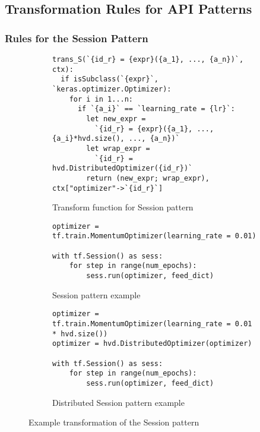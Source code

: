 \subsection{Transformation Rules for API Patterns}


\subsubsection{Rules for the Session Pattern}

\begin{figure}[h!]\centering

  \begin{subfigure}{1\textwidth}
  \scriptsize
  \begin{lstlisting}[style=mpython]
trans_S(`{id_r} = {expr}({a_1}, ..., {a_n})`, ctx): 
  if isSubclass(`{expr}`, `keras.optimizer.Optimizer):
    for i in 1...n:
      if `{a_i}` == `learning_rate = {lr}`:
	    let new_expr = 
          `{id_r} = {expr}({a_1}, ..., {a_i}*hvd.size(), ..., {a_n})`
        let wrap_expr = 
          `{id_r} = hvd.DistributedOptimizer({id_r})`
        return (new_expr; wrap_expr), ctx["optimizer"->`{id_r}`] 
  \end{lstlisting}
  \caption{Transform function for Session pattern}
  \label{fig:trans:sessiontrans:fn}
  \end{subfigure}

  \begin{subfigure}[t]{1\textwidth}
    \begin{lstlisting}[style=mpython]
optimizer = tf.train.MomentumOptimizer(learning_rate = 0.01)

with tf.Session() as sess:
    for step in range(num_epochs): 
        sess.run(optimizer, feed_dict)\end{lstlisting}
    \caption{Session pattern example}
    \label{fig:trans:sessiontrans:a}
  \end{subfigure}
  \hspace{5mm}
  \begin{subfigure}[t]{1\textwidth}
    \begin{lstlisting}[style=mpython]
optimizer = tf.train.MomentumOptimizer(learning_rate = 0.01 * hvd.size())
optimizer = hvd.DistributedOptimizer(optimizer)

with tf.Session() as sess:
    for step in range(num_epochs): 
        sess.run(optimizer, feed_dict)\end{lstlisting}
    \caption{Distributed Session pattern example}
    \label{fig:trans:sessiontrans:b}
  \end{subfigure}
  \caption{Example transformation of the Session pattern}
  \label{fig:trans:sessiontrans}
\end{figure}

